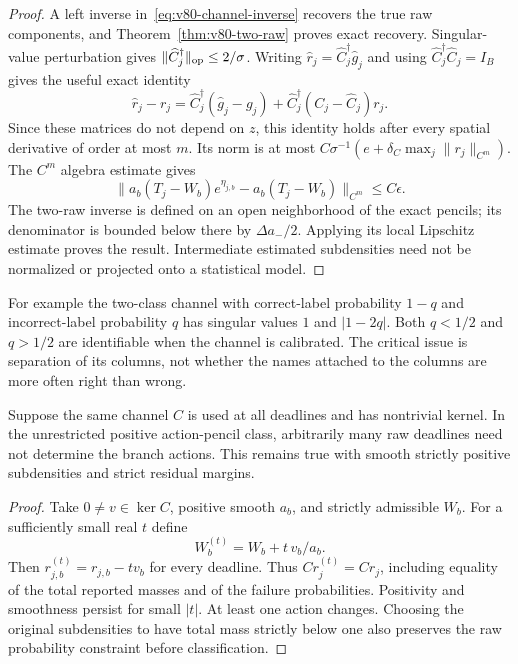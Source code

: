 \begin{proof}
A left inverse in~\eqref{eq:v80-channel-inverse} recovers the true raw
components, and Theorem~\ref{thm:v80-two-raw} proves exact recovery.
Singular-value perturbation gives
$\|\widehat C_j^\dagger\|_{\rm op}\le2/\sigma$.
Writing $\widehat r_j=\widehat C_j^\dagger\widehat g_j$ and using
$\widehat C_j^\dagger\widehat C_j=I_B$ gives the useful exact identity
\begin{equation}\label{eq:v80-calibration-error}
 \widehat r_j-r_j
 =\widehat C_j^\dagger(\widehat g_j-g_j)
  +\widehat C_j^\dagger(C_j-\widehat C_j)r_j.
\end{equation}
Since these matrices do not depend on $z$, this identity holds after
every spatial derivative of order at most $m$.  Its norm is at most
$C\sigma^{-1}(e+\delta_C\max_j\|r_j\|_{C^m})$.
The $C^m$ algebra estimate gives
\[
 \|a_b(T_j-W_b)e^{\eta_{j,b}}-a_b(T_j-W_b)\|_{C^m}
                         \le C\epsilon.
\]
The two-raw inverse is defined on an open neighborhood of the exact
pencils; its denominator is bounded below there by
$\Delta a_-/2$.  Applying its local Lipschitz estimate proves the result.
Intermediate estimated subdensities need not be normalized or projected
onto a statistical model.
\end{proof}

For example the two-class channel with correct-label probability $1-q$
and incorrect-label probability $q$ has singular values $1$ and
$|1-2q|$.  Both $q<1/2$ and $q>1/2$ are identifiable when the channel
is calibrated.  The critical issue is separation of its columns, not
whether the names attached to the columns are more often right than wrong.

\begin{proposition}
\label{prop:v80-rank}
Suppose the same channel $C$ is used at all deadlines and has nontrivial
kernel.  In the unrestricted positive action-pencil class, arbitrarily
many raw deadlines need not determine the branch actions.  This remains
true with smooth strictly positive subdensities and strict residual
margins.
\end{proposition}
\begin{proof}
Take $0\ne v\in\ker C$, positive smooth $a_b$, and strictly admissible
$W_b$.  For a sufficiently small real $t$ define
\[
                 W_b^{(t)}=W_b+t\,v_b/a_b.
\]
Then $r_{j,b}^{(t)}=r_{j,b}-t v_b$ for every deadline.  Thus
$C r_j^{(t)}=C r_j$, including equality of the total reported masses
and of the failure probabilities.  Positivity and smoothness persist
for small $|t|$.  At least one action changes.  Choosing the original
subdensities to have total mass strictly below one also preserves the
raw probability constraint before classification.
\end{proof}

